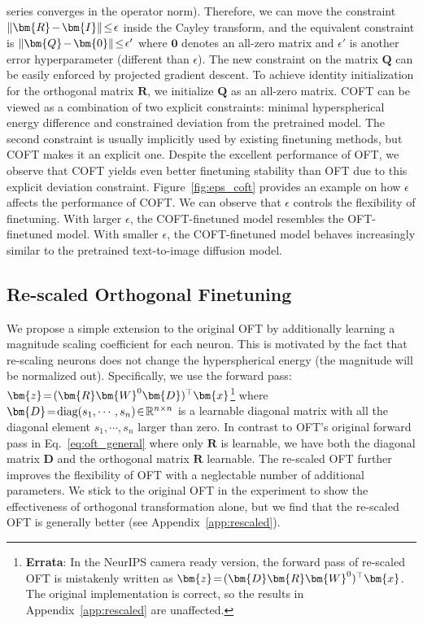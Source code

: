 series converges in the operator norm). Therefore, we can move the constraint $\thickmuskip=2mu \medmuskip=2mu\|\bm{R}-\bm{I}\|\leq\epsilon$ inside the Cayley transform, and the equivalent constraint is $\thickmuskip=2mu \medmuskip=2mu \|\bm{Q}-\bm{0}\|\leq\epsilon'$ where $\bm{0}$ denotes an all-zero matrix and $\epsilon'$ is another error hyperparameter (different than $\epsilon$). The new constraint on the matrix $\bm{Q}$ can be easily enforced by projected gradient descent. To achieve identity initialization for the orthogonal matrix $\bm{R}$, we initialize $\bm{Q}$ as an all-zero matrix. COFT can be viewed as a combination of two explicit constraints: minimal hyperspherical energy difference and constrained deviation from the pretrained model. The second constraint is usually implicitly used by existing finetuning methods, but COFT makes it an explicit one. Despite the excellent performance of OFT, we observe that COFT yields even better finetuning stability than OFT due to this explicit deviation constraint. Figure~\ref{fig:eps_coft} provides an example on how $\epsilon$ affects the performance of COFT. We can observe that $\epsilon$ controls the flexibility of finetuning. With larger $\epsilon$, the COFT-finetuned model resembles the OFT-finetuned model. With smaller $\epsilon$, the COFT-finetuned model behaves increasingly similar to the pretrained text-to-image diffusion model.

\subsection{Re-scaled Orthogonal Finetuning}

We propose a simple extension to the original OFT by additionally learning a magnitude scaling coefficient for each neuron. This is motivated by the fact that re-scaling neurons does not change the hyperspherical energy (the magnitude will be normalized out). Specifically, we use the forward pass: $\thickmuskip=2mu \medmuskip=2mu\bm{z}=(\bm{R}\bm{W}^0\bm{D})^\top\bm{x}$\footnote{\textbf{Errata}: In the NeurIPS camera ready version, the forward pass of re-scaled OFT is mistakenly written as $\thickmuskip=2mu \medmuskip=2mu\bm{z}=(\bm{D}\bm{R}\bm{W}^0)^\top\bm{x}$. The original implementation is correct, so the results in Appendix~\ref{app:rescaled} are unaffected.} where $\thickmuskip=2mu \medmuskip=2mu \bm{D}=\text{diag}(s_1,\cdots,s_n)\in\mathbb{R}^{n\times n}$ is a learnable diagonal matrix with all the diagonal element $s_1,\cdots,s_n$ larger than zero. In contrast to OFT's original forward pass in Eq.~\eqref{eq:oft_general} where only $\bm{R}$ is learnable, we have both the diagonal matrix $\bm{D}$ and the orthogonal matrix $\bm{R}$ learnable. The re-scaled OFT further improves the flexibility of OFT with a neglectable number of additional parameters. We stick to the original OFT in the experiment to show the effectiveness of orthogonal transformation alone, but we find that the re-scaled OFT is generally better (see Appendix~\ref{app:rescaled}).

